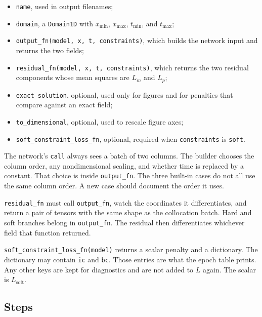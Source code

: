 \documentclass[11pt]{article}
\begin{document}
\begin{itemize}[leftmargin=1.4em]
\item \texttt{name}, used in output filenames;
\item \texttt{domain}, a \texttt{Domain1D} with \(x_{\min}\), \(x_{\max}\), \(t_{\min}\), and \(t_{\max}\);
\item \texttt{output\_fn(model, x, t, constraints)}, which builds the network input and returns the two fields;
\item \texttt{residual\_fn(model, x, t, constraints)}, which returns the two residual components whose mean squares are \(L_{m}\) and \(L_{p}\);
\item \texttt{exact\_solution}, optional, used only for figures and for penalties that compare against an exact field;
\item \texttt{to\_dimensional}, optional, used to rescale figure axes;
\item \texttt{soft\_constraint\_loss\_fn}, optional, required when \texttt{constraints} is \texttt{soft}.
\end{itemize}

The network's \texttt{call} always sees a batch of two columns.
The builder chooses the column order, any nondimensional scaling, and whether time is replaced by a constant.
That choice is inside \texttt{output\_fn}.
The three built-in cases do not all use the same column order.
A new case should document the order it uses.

\texttt{residual\_fn} must call \texttt{output\_fn}, watch the coordinates it differentiates, and return a pair of tensors with the same shape as the collocation batch.
Hard and soft branches belong in \texttt{output\_fn}.
The residual then differentiates whichever field that function returned.

\texttt{soft\_constraint\_loss\_fn(model)} returns a scalar penalty and a dictionary.
The dictionary may contain \texttt{ic} and \texttt{bc}.
Those entries are what the epoch table prints.
Any other keys are kept for diagnostics and are not added to \(L\) again.
The scalar is \(L_{\mathrm{soft}}\).

\subsection{Steps}
\end{document}
